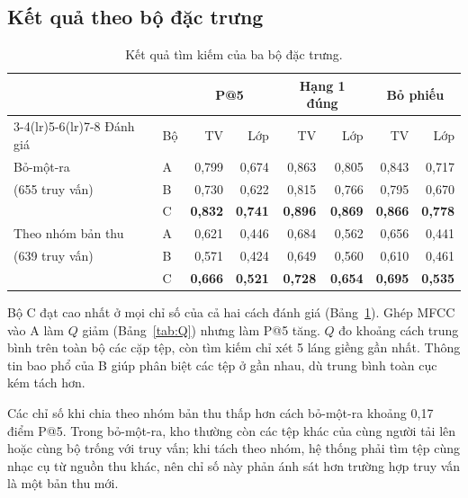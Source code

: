 \documentclass[11pt,a4paper]{article}
\begin{document}
\subsection{Kết quả theo bộ đặc trưng}
\begin{table}[htbp]
\centering\small
\caption{Kết quả tìm kiếm của ba bộ đặc trưng.}\label{tab:ketqua}
\begin{tabular}{llrrrrrr}
\toprule
& & \multicolumn{2}{c}{P@5} & \multicolumn{2}{c}{Hạng 1 đúng} & \multicolumn{2}{c}{Bỏ phiếu}\\
\cmidrule(lr){3-4}\cmidrule(lr){5-6}\cmidrule(lr){7-8}
Đánh giá & Bộ & TV & Lớp & TV & Lớp & TV & Lớp\\\midrule
Bỏ-một-ra & A & 0,799 & 0,674 & 0,863 & 0,805 & 0,843 & 0,717\\
(655 truy vấn) & B & 0,730 & 0,622 & 0,815 & 0,766 & 0,795 & 0,670\\
& C & \textbf{0,832} & \textbf{0,741} & \textbf{0,896} & \textbf{0,869} & \textbf{0,866} & \textbf{0,778}\\\midrule
Theo nhóm bản thu & A & 0,621 & 0,446 & 0,684 & 0,562 & 0,656 & 0,441\\
(639 truy vấn) & B & 0,571 & 0,424 & 0,649 & 0,560 & 0,610 & 0,461\\
& C & \textbf{0,666} & \textbf{0,521} & \textbf{0,728} & \textbf{0,654} & \textbf{0,695} & \textbf{0,535}\\\bottomrule
\end{tabular}
\end{table}
Bộ C đạt cao nhất ở mọi chỉ số của cả hai cách đánh giá (Bảng~\ref{tab:ketqua}). Ghép MFCC vào A làm $Q$ giảm (Bảng~\ref{tab:Q}) nhưng làm P@5 tăng. $Q$ đo khoảng cách trung bình trên toàn bộ các cặp tệp, còn tìm kiếm chỉ xét 5 láng giềng gần nhất. Thông tin bao phổ của B giúp phân biệt các tệp ở gần nhau, dù trung bình toàn cục kém tách hơn.

Các chỉ số khi chia theo nhóm bản thu thấp hơn cách bỏ-một-ra khoảng 0,17 điểm P@5. Trong bỏ-một-ra, kho thường còn các tệp khác của cùng người tải lên hoặc cùng bộ trống với truy vấn; khi tách theo nhóm, hệ thống phải tìm tệp cùng nhạc cụ từ nguồn thu khác, nên chỉ số này phản ánh sát hơn trường hợp truy vấn là một bản thu mới.
\end{document}

